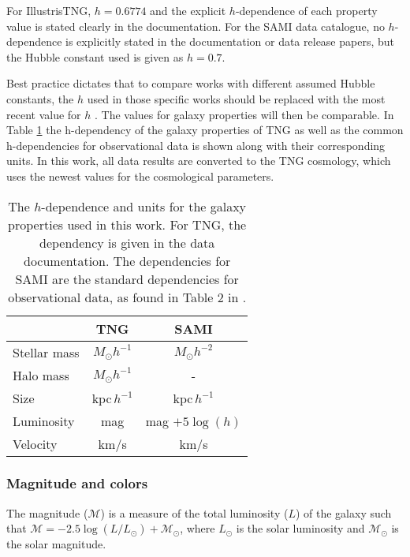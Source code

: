 For IllustrisTNG, $h=0.6774$ and the explicit $h$-dependence of each property value is stated clearly in the documentation. For the SAMI data catalogue, no $h$-dependence is explicitly stated in the documentation or data release papers, but the Hubble constant used is given as $h = 0.7$.

Best practice dictates that to compare works with different assumed Hubble constants, the $h$ used in those specific works should be replaced with the most recent value for $h$ \parencite{Croton2013}. The values for galaxy properties will then be comparable. In Table \ref{h_dependence} the h-dependency of the galaxy properties of TNG as well as the common h-dependencies for observational data is shown along with their corresponding units. In this work, all data results are converted to the TNG cosmology, which uses the newest values for the cosmological parameters.

\begin{table}
\begin{center}
\caption{The $h$-dependence and units for the galaxy properties used in this work. For TNG, the dependency is given in the data documentation. The dependencies for SAMI are the standard dependencies for observational data, as found in Table 2 in \textcite{Croton2013}.}
\label{h_dependence}
\begin{tabular}{ l| c c }
 \hline
 \hline
   & TNG & SAMI \\
 \hline
 Stellar mass & $M_{\odot}h^{-1}$ & $M_{\odot}h^{-2}$ \\ 
 Halo mass & $M_{\odot}h^{-1}$ & - \\
 Size & kpc$\,h^{-1}$ & kpc$\,h^{-1}$ \\
 Luminosity & mag & mag $+5\log(h)$ \\
 Velocity & km/s & km/s  \\ 

 \hline 
\end{tabular}
\end{center}
\end{table}


\subsubsection{Magnitude and colors}
The magnitude ($\mathcal{M}$) is a measure of the total luminosity ($L$) of the galaxy such that $\mathcal{M} = -2.5 \log(L/L_\odot) + \mathcal{M}_\odot$, where $L_\odot$ is the solar luminosity and $\mathcal{M}_\odot$ is the solar magnitude.

